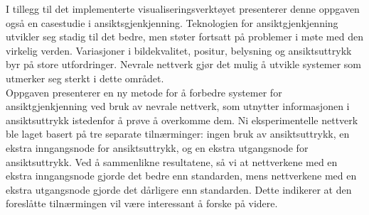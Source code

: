\noindent I tillegg til det implementerte visualiseringsverktøyet presenterer denne oppgaven også en casestudie i ansiktsgjenkjenning. Teknologien for ansiktgjenkjenning utvikler seg stadig til det bedre, men støter fortsatt på problemer i møte med den virkelig verden. Variasjoner i bildekvalitet, positur, belysning og ansiktsuttrykk byr på store utfordringer. Nevrale nettverk gjør det mulig å utvikle systemer som utmerker seg sterkt i dette området. \\

\noindent Oppgaven presenterer en ny metode for å forbedre systemer for ansiktgjenkjenning ved bruk av nevrale nettverk, som utnytter informasjonen i ansiktsuttrykk istedenfor å prøve å overkomme dem. Ni eksperimentelle nettverk ble laget basert på tre separate tilnærminger: ingen bruk av ansiktsuttrykk, en ekstra inngangsnode for ansiktsuttrykk, og en ekstra utgangsnode for ansiktsuttrykk. Ved å sammenlikne resultatene, så vi at nettverkene med en ekstra inngangsnode gjorde det bedre enn standarden, mens nettverkene med en ekstra utgangsnode gjorde det dårligere enn standarden. Dette indikerer at den foreslåtte tilnærmingen vil være interessant å forske på videre.

\clearpage